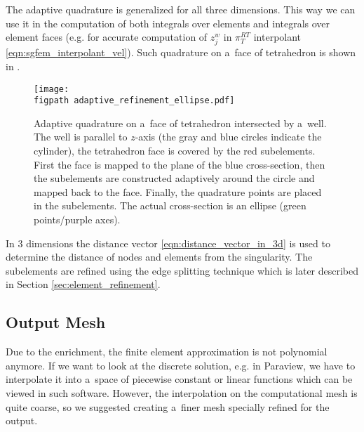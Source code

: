 The adaptive quadrature is generalized for all three dimensions.
This way we can use it in the computation of both integrals over elements and integrals
over element faces (e.g. for accurate computation of $z^w_j$ in $\pi^{RT}_T$ interpolant \eqref{eqn:sgfem_interpolant_vel}).
Such quadrature on a~face of tetrahedron is shown in .
\begin{figure}[!htb]
  \centering    
    \texttt{[image: \\figpath adaptive\_refinement\_ellipse.pdf]}
  \caption[Adaptive quadrature on a~face of tetrahedron.]
  {Adaptive quadrature on a~face of tetrahedron intersected by a~well.
   The well is parallel to $z$-axis (the gray and blue circles indicate the cylinder),
   the tetrahedron face is covered by the red subelements.
   First the face is mapped to the plane of the blue cross-section, then the subelements are
   constructed adaptively around the circle and mapped back to the face.
   Finally, the quadrature points are placed in the subelements.
   The actual cross-section is an ellipse (green points/purple axes).
  }
  \label{fig:adaptive_refinement_ellipse}
\end{figure}



In 3 dimensions the distance vector \eqref{eqn:distance_vector_in_3d} is used to determine the distance of nodes and elements from the singularity.
The subelements are refined using the edge splitting technique which is later described in Section \ref{sec:element_refinement}.

\subsection{Output Mesh}
\label{sec:output_mesh}

Due to the enrichment, the finite element approximation is not polynomial anymore.
If we want to look at the discrete solution, e.g. in Paraview, we have to interpolate it into a~space of piecewise
constant or linear functions which can be viewed in such software. However, the interpolation on the computational mesh
is quite coarse, so we suggested creating a~finer mesh specially refined for the output.

